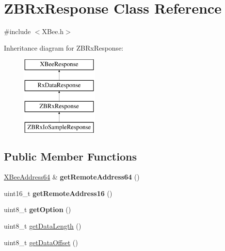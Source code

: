 \hypertarget{classZBRxResponse}{\section{\-Z\-B\-Rx\-Response \-Class \-Reference}
\label{classZBRxResponse}
}


{\ttfamily \#include $<$\-X\-Bee.\-h$>$}

\-Inheritance diagram for \-Z\-B\-Rx\-Response\-:\begin{figure}[H]
\begin{center}
\leavevmode
\includegraphics[height=4.000000cm]{classZBRxResponse}
\end{center}
\end{figure}
\subsection*{\-Public \-Member \-Functions}
\begin{DoxyCompactItemize}
\item 
\hypertarget{classZBRxResponse_a9af7b74ef6596f17312d7db042ba7e18}{\hyperlink{classXBeeAddress64}{\-X\-Bee\-Address64} \& {\bfseries get\-Remote\-Address64} ()}\label{classZBRxResponse_a9af7b74ef6596f17312d7db042ba7e18}

\item 
\hypertarget{classZBRxResponse_a5f7c9237a72e7f0107f2baf962ded78b}{uint16\-\_\-t {\bfseries get\-Remote\-Address16} ()}\label{classZBRxResponse_a5f7c9237a72e7f0107f2baf962ded78b}

\item 
\hypertarget{classZBRxResponse_a39ed277ac12274d7ae143a7cb27b219b}{uint8\-\_\-t {\bfseries get\-Option} ()}\label{classZBRxResponse_a39ed277ac12274d7ae143a7cb27b219b}

\item 
uint8\-\_\-t \hyperlink{classZBRxResponse_a9d2b73060d611bbdd581e0ceb195fd31}{get\-Data\-Length} ()
\item 
uint8\-\_\-t \hyperlink{classZBRxResponse_ad54e6ff3008f79d0ed32a78cc3d69151}{get\-Data\-Offset} ()
\end{DoxyCompactItemize}


